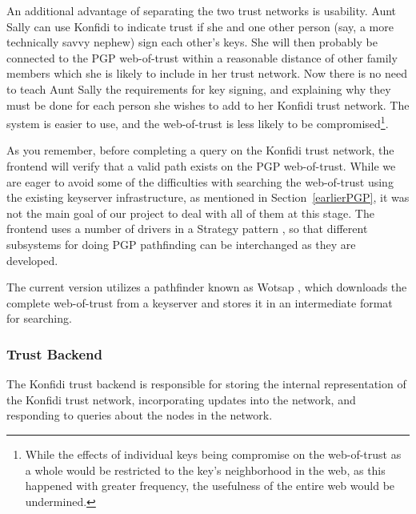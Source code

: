\documentclass{acm_proc_article-sp}
\begin{document}
An additional advantage of separating the two trust networks is usability.  Aunt Sally can use Konfidi to indicate trust if she and one other person (say, a more technically savvy nephew) sign each other's keys.  She will then probably be connected to the PGP web-of-trust within a reasonable distance of other family members which she is likely to include in her trust network.  Now there is no need to teach Aunt Sally the requirements for key signing, and explaining why they must be done for each person she wishes to add to her Konfidi trust network.  The system is easier to use, and the web-of-trust is less likely to be compromised\footnote{While the effects of individual keys being compromise on the web-of-trust as a whole would be restricted to the key's neighborhood in the web, as this happened with greater frequency, the usefulness of the entire web would be undermined.}.

As you remember, before completing a query on the Konfidi trust network, the frontend will verify that a valid path exists on the PGP web-of-trust.  While we are eager to avoid some of the difficulties with searching the web-of-trust using the existing keyserver infrastructure, as mentioned in Section~\ref{earlierPGP}, it was not the main goal of our project to deal with all of them at this stage.  The frontend uses a number of drivers in a Strategy pattern \cite{designPatterns}, so that different subsystems for doing PGP pathfinding can be interchanged as they are developed.

The current version utilizes a pathfinder known as Wotsap \cite{wotsap}, which downloads the complete web-of-trust from a keyserver and stores it in an intermediate format for searching.

\subsubsection{Trust Backend}
The Konfidi trust backend is responsible for storing the internal representation of the Konfidi trust network, incorporating updates into the network, and responding to queries about the nodes in the network.
\end{document}

